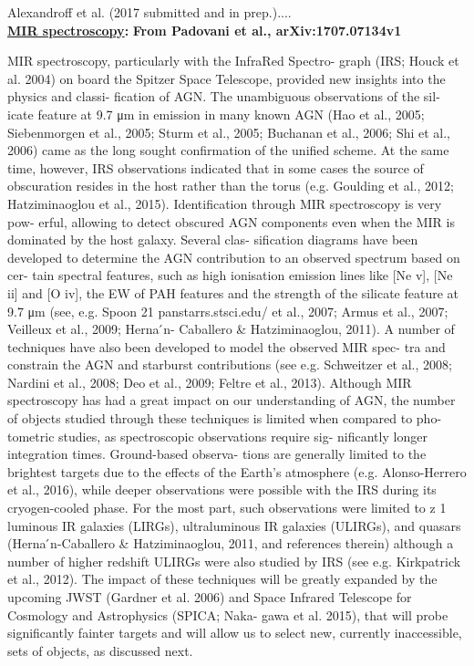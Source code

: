 \smallskip
\smallskip
\noindent
Alexandroff et al. (2017 submitted and in prep.).... \\



\medskip
\medskip
\smallskip
\smallskip
\noindent
{\bf \underline{MIR spectroscopy}:}
{\bf From Padovani et al.,  arXiv:1707.07134v1}

MIR spectroscopy, particularly with the InfraRed Spectro- graph (IRS;
Houck et al. 2004) on board the Spitzer Space Telescope, provided new
insights into the physics and classi- fication of AGN. The unambiguous
observations of the sil- icate feature at 9.7 μm in emission in many
known AGN (Hao et al., 2005; Siebenmorgen et al., 2005; Sturm et al.,
2005; Buchanan et al., 2006; Shi et al., 2006) came as the long sought
confirmation of the unified scheme. At the same time, however, IRS
observations indicated that in some cases the source of obscuration
resides in the host rather than the torus (e.g. Goulding et al., 2012;
Hatziminaoglou et al., 2015).  Identification through MIR spectroscopy
is very pow- erful, allowing to detect obscured AGN components even
when the MIR is dominated by the host galaxy. Several clas- sification
diagrams have been developed to determine the AGN contribution to an
observed spectrum based on cer- tain spectral features, such as high
ionisation emission lines like [Ne v], [Ne ii] and [O iv], the EW of
PAH features and the strength of the silicate feature at 9.7 μm (see,
e.g. Spoon 21 panstarrs.stsci.edu/ et al., 2007; Armus et al., 2007;
Veilleux et al., 2009; Herna ́n- Caballero & Hatziminaoglou, 2011). A
number of techniques have also been developed to model the observed
MIR spec- tra and constrain the AGN and starburst contributions (see
e.g. Schweitzer et al., 2008; Nardini et al., 2008; Deo et al., 2009;
Feltre et al., 2013).  Although MIR spectroscopy has had a great
impact on our understanding of AGN, the number of objects studied
through these techniques is limited when compared to pho- tometric
studies, as spectroscopic observations require sig- nificantly longer
integration times. Ground-based observa- tions are generally limited
to the brightest targets due to the effects of the Earth’s atmosphere
(e.g. Alonso-Herrero et al., 2016), while deeper observations were
possible with the IRS during its cryogen-cooled phase. For the most
part, such observations were limited to z 1 luminous IR galaxies
(LIRGs), ultraluminous IR galaxies (ULIRGs), and quasars (Herna
́n-Caballero & Hatziminaoglou, 2011, and references therein) although a
number of higher redshift ULIRGs were also studied by IRS (see
e.g. Kirkpatrick et al., 2012). The impact of these techniques will be
greatly expanded by the upcoming JWST (Gardner et al. 2006) and Space
Infrared Telescope for Cosmology and Astrophysics (SPICA; Naka- gawa
et al. 2015), that will probe significantly fainter targets and will
allow us to select new, currently inaccessible, sets of objects, as
discussed next.


